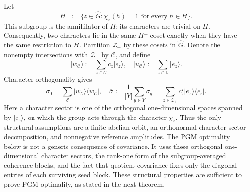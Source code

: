 \documentclass[11pt]{article}
\newcommand{\1}{\mathbf 1}
\newcommand{\ket}[1]{\lvert #1\rangle}
\newcommand{\bra}[1]{\langle #1\rvert}
\theoremstyle{plain}
\theoremstyle{definition}
\theoremstyle{remark}
\begin{document}
Let
\begin{equation}
 H^\perp:=\{z\in\widehat G:\chi_z(h)=1\text{ for every }h\in H\}.
 \label{eq:abstract-annihilator}
\end{equation}
This subgroup is the annihilator of $H$: its characters are trivial on $H$.
Consequently, two characters lie in the same $H^\perp$-coset exactly when they
have the same restriction to $H$.  Partition $\mathcal Z_+$ by these cosets in
$\widehat G$.  Denote
the nonempty intersections with $\mathcal Z_+$ by $\mathcal C$, and define
\begin{equation}
 \ket{w_{\mathcal C}}:=\sum_{z\in\mathcal C}c_z\ket{e_z},
 \quad
 \ket{u_{\mathcal C}}:=\sum_{z\in\mathcal C}\ket{e_z}.
 \label{eq:abstract-coset-vectors}
\end{equation}
Character orthogonality gives
\begin{equation}
 \sigma_0=\sum_{\mathcal C}
 \ket{w_{\mathcal C}}\!\bra{w_{\mathcal C}},
 \quad
 \overline\sigma:=\frac1{\lvert Y\rvert}\sum_{y\in Y}\sigma_y
 =\sum_{z\in\mathcal Z_+}c_z^2
 \ket{e_z}\!\bra{e_z}.
 \label{eq:abstract-conditioned-average-blocks}
\end{equation}
Here a character sector is one of the orthogonal one-dimensional spaces
spanned by $|e_z\rangle$, on which the group acts through the character
$\chi_z$.  Thus the only structural assumptions are a finite abelian orbit,
an orthonormal character-sector decomposition, and nonnegative reference
amplitudes.  The PGM optimality below is not a generic consequence of
covariance.  It uses these orthogonal one-dimensional character sectors, the
rank-one form of the subgroup-averaged coherence blocks, and the fact that
quotient covariance fixes only the diagonal entries of each surviving seed
block.  These structural properties are sufficient to prove PGM optimality, as stated
in the next theorem.
\end{document}
